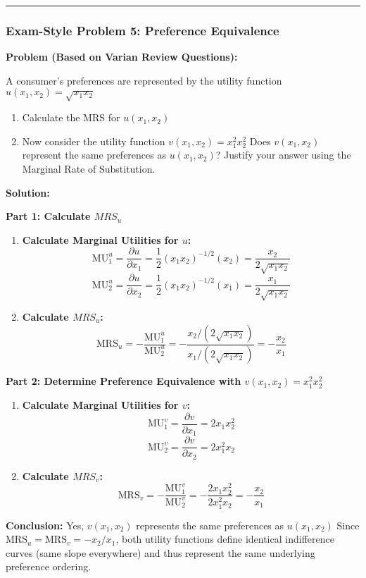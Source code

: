 \documentclass{article}
\begin{document}
\noindent\rule{\linewidth}{0.4pt}

\subsubsection*{Exam-Style Problem 5: Preference Equivalence}

\textbf{Problem (Based on Varian Review Questions):}

A consumer's preferences are represented by the utility function $u(x_1, x_2) = \sqrt{x_1 x_2}$
\begin{enumerate}
    \item Calculate the MRS for $u(x_1, x_2)$
    \item Now consider the utility function $v(x_1, x_2) = x_1^2 x_2^2$ Does $v(x_1, x_2)$ represent the same preferences as $u(x_1, x_2)$? Justify your answer using the Marginal Rate of Substitution.
\end{enumerate}

\textbf{Solution:}

\textbf{Part 1: Calculate $MRS_u$}
\begin{enumerate}
    \item \textbf{Calculate Marginal Utilities for $u$:}
    \[ \text{MU}_1^u = \frac{\partial u}{\partial x_1} = \frac{1}{2}(x_1 x_2)^{-1/2} (x_2) = \frac{x_2}{2\sqrt{x_1 x_2}} \]
    \[ \text{MU}_2^u = \frac{\partial u}{\partial x_2} = \frac{1}{2}(x_1 x_2)^{-1/2} (x_1) = \frac{x_1}{2\sqrt{x_1 x_2}} \]
    \item \textbf{Calculate $MRS_u$:}
    \[ \text{MRS}_u = -\frac{\text{MU}_1^u}{\text{MU}_2^u} = -\frac{x_2 / (2\sqrt{x_1 x_2})}{x_1 / (2\sqrt{x_1 x_2})} = -\frac{x_2}{x_1} \]
\end{enumerate}

\textbf{Part 2: Determine Preference Equivalence with $v(x_1, x_2) = x_1^2 x_2^2$}
\begin{enumerate}
    \item \textbf{Calculate Marginal Utilities for $v$:}
    \[ \text{MU}_1^v = \frac{\partial v}{\partial x_1} = 2x_1 x_2^2 \]
    \[ \text{MU}_2^v = \frac{\partial v}{\partial x_2} = 2x_1^2 x_2 \]
    \item \textbf{Calculate $MRS_v$:}
    \[ \text{MRS}_v = -\frac{\text{MU}_1^v}{\text{MU}_2^v} = -\frac{2x_1 x_2^2}{2x_1^2 x_2} = -\frac{x_2}{x_1} \]
\end{enumerate}

\textbf{Conclusion:} Yes, $v(x_1, x_2)$ represents the same preferences as $u(x_1, x_2)$ Since $\text{MRS}_u = \text{MRS}_v = -x_2/x_1$, both utility functions define identical indifference curves (same slope everywhere) and thus represent the same underlying preference ordering.
\end{document}
